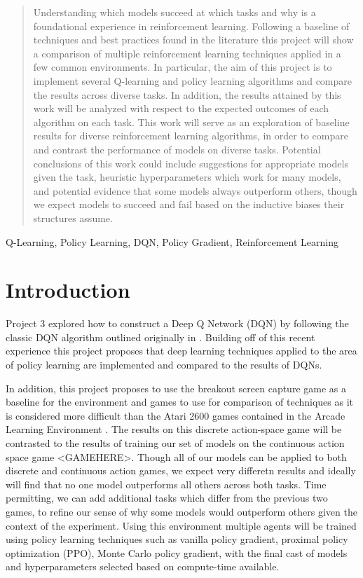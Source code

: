 \documentclass[conference]{IEEEtran}
\begin{document}
\begin{abstract}
    Understanding which models succeed at which tasks and why is a foundational experience in reinforcement learning.
    Following a baseline of techniques and best practices found in the literature this project will show a comparison of multiple reinforcement learning techniques applied in a few common environments.
    In particular, the aim of this project is to implement several Q-learning and policy learning algorithms and compare the results across diverse tasks.
    In addition, the results attained by this work will be analyzed with respect to the expected outcomes of each algorithm on each task.
    This work will serve as an exploration of baseline results for diverse reinforcement learning algorithms, in order to compare and contrast the performance of models on diverse tasks.
    Potential conclusions of this work could include suggestions for appropriate models given the task, heuristic hyperparameters which work for many models, and potential evidence that some models always outperform others, though we expect models to succeed and fail based on the inductive biases their structures assume.
\end{abstract}

\begin{IEEEkeywords}
Q-Learning, Policy Learning, DQN, Policy Gradient, Reinforcement Learning
\end{IEEEkeywords}

\section{Introduction}
Project 3 explored how to construct a Deep Q Network (DQN) by following the classic DQN algorithm outlined originally in \cite{DQNOriginalPaper}.
Building off of this recent experience this project proposes that deep learning techniques applied to the area of policy learning are implemented and compared to the results of DQNs.

In addition, this project proposes to use the \cite{DQNOriginalPaper} breakout screen capture game as a baseline for the environment and games to use for comparison of techniques as it is considered more difficult than the Atari 2600 games contained in the Arcade Learning Environment \cite{Bellemare_2013}. The results on this discrete action-space game will be contrasted to the results of training our set of models on the continuous action space game <GAMEHERE>. Though all of our models can be applied to both discrete and continuous action games, we expect very differetn results and ideally will find that no one model outperforms all others across both tasks. Time permitting, we can add additional tasks which differ from the previous two games, to refine our sense of why some models would outperform others given the context of the experiment.
Using this environment multiple agents will be trained using policy learning techniques such as vanilla policy gradient, proximal policy optimization (PPO), Monte Carlo policy gradient, with the final cast of models and hyperparameters selected based on compute-time available.
\end{document}
